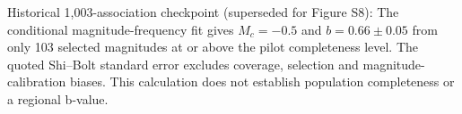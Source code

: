 Historical 1,003-association checkpoint (superseded for Figure S8): The conditional magnitude-frequency fit gives $M_c=-0.5$ and $b=0.66 \pm 0.05$ from only 103 selected magnitudes at or above the pilot completeness level. The quoted Shi--Bolt standard error excludes coverage, selection and magnitude-calibration biases. This calculation does not establish population completeness or a regional b-value.
